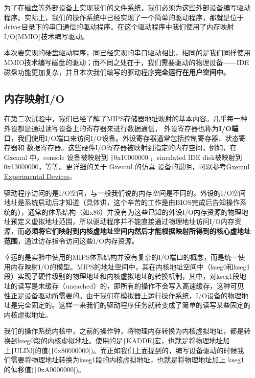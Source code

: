 为了在磁盘等外部设备上实现我们的文件系统，我们必须为这些外部设备编写驱动程序。实际上，我们的操作系统中已经实现了一个简单的驱动程序，那就是位于driver目录下的串口通信的驱动程序。在这个驱动程序中我们使用了内存映射I/O(MMIO)技术编写驱动。

本次要实现的硬盘驱动程序，同已经实现的串口驱动相比，相同的是我们同样使用MMIO技术编写磁盘的驱动；而不同之处在于，我们需要驱动的物理设备——IDE磁盘功能更加复杂，并且本次我们编写的驱动程序\textbf{完全运行在用户空间中}。

\subsection{内存映射I/O}

在第二次试验中，我们已经了解了MIPS存储器地址映射的基本内容。几乎每一种外设都是通过读写设备上的寄存器来进行数据通信，
外设寄存器也称为\textbf{I/O端口}，我们使用I/O端口来访问I/O设备。外设寄存器通常包括控制寄存器、状态寄存器和
数据寄存器。这些硬件I/O寄存器被映射到指定的内存空间，例如，在 Gxemul 中，console 设备被映射到
\texttt|0x10000000|，simulated IDE disk被映射到 0x13000000，等等。更详细的关于 Gxemul 的仿真
设备的说明，可以参考\href{http://gxemul.sourceforge.net/gxemul-stable/doc/experiments.html}{Gxemul
Experimental Devices}。

驱动程序访问的是I/O空间，与一般我们说的内存空间是不同的。外设的I/O空间地址是系统启动后才知道（具体讲，这个辛苦的工作是由BIOS完成后告知操作系统的），通常的体系结构（如x86）并没有为这些已知的外设I/O内存资源的物理地址预定义虚拟地址范围，所以驱动程序并不能直接通过物理地址访问I/O内存资源，而\textbf{必须将它们映射到内核虚地址空间内然后才能根据映射所得到的核心虚地址范围}，通过访存指令访问这些I/O内存资源。

幸运的是实验中使用的MIPS体系结构并没有复杂的I/O端口的概念，而是统一使用内存映射I/O的模型。MIPS的地址空间中，其在内核地址空间中（kseg0和kseg1段）实现了硬件级别的物理地址和内核虚拟地址的转换机制，其中，对kseg1段地址的读写是未缓存（uncached）的，即所有的操作不会写入高速缓存，这种可见性正是设备驱动所需要的。由于我们在模拟器上运行操作系统，I/O设备的物理地址是完全固定的。这样一来我们的驱动程序任务就转变成了简单的读写某些固定的内核虚拟地址。

我们的操作系统内核中，之前的操作钟，将物理内存转换为内核虚拟地址，都是转换到kseg0段的内核虚拟地址。使用的是\texttt|KADDR|宏，也就是将物理地址加上\texttt|ULIM|的值(\texttt|0x80000000|)。而正如我们上面提到的，编写设备驱动的时候我们需要将物理地址转换为kseg1段的内核虚拟地址，也就是将物理地址加上 kseg1 的偏移值(\texttt|0xA0000000|)。

